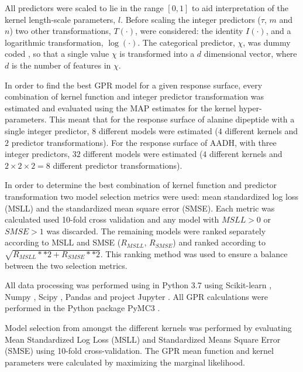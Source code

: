 All predictors were scaled to lie in the range $[0, 1]$ to aid interpretation of the kernel length-scale parameters, $l$. Before scaling the integer predictors ($\tau$, $m$ and $n$) two other transformations, $T(\cdot)$, were considered: the identity $I(\cdot)$, and a logarithmic transformation, $\log(\cdot)$. The categorical predictor, $\chi$, was dummy coded \cite{dalyDummyCodingVs2016}, so that a single value $\chi$ is transformed into a $d$ dimensional vector, where $d$ is the number of features in $\chi$.

In order to find the best GPR model for a given response surface, every combination of kernel function and integer predictor transformation was estimated and evaluated using the MAP estimates for the kernel hyper-parameters. This meant that for the response surface of alanine dipeptide with a single integer predictor, $8$ different models were estimated ($4$ different kernels and $2$ predictor transformations). For the response surface of AADH, with three integer predictors, $32$ different models were estimated ($4$ different kernels and $2\times2\times2=8$ different predictor transformations). 

In order to determine the best combination of kernel function and predictor transformation two model selection metrics were used:  mean standardized log loss (MSLL) and the standardized mean square error (SMSE). Each metric was calculated used 10-fold cross validation and any model with $MSLL > 0$ or $SMSE > 1$ was discarded. The remaining models were ranked separately according to MSLL and SMSE ($R_{MSLL}$, $R_{SMSE}$) and ranked according to $\sqrt{R_{MSLL}**2 + R_{SMSE}**2}$. This ranking method was used to ensure a balance between the two selection metrics. 

All data processing was performed using in Python 3.7 using Scikit-learn \cite{pedregosaScikitlearnMachineLearning2011}, Numpy \cite{waltNumPyArrayStructure2011}, Scipy \cite{virtanenSciPyFundamentalAlgorithms2020}, Pandas \cite{mckinneyPandasFoundationalPython2011} and project Jupyter \cite{kluyverJupyterNotebooksPublishing2016}. All GPR calculations were performed in the Python package PyMC3 . 



Model selection from amongst the different kernels was performed by evaluating Mean Standardized Log Loss (MSLL) and Standardized Means Square Error (SMSE) using 10-fold cross-validation. The GPR mean function and kernel parameters were calculated by maximizing the marginal likelihood. 

